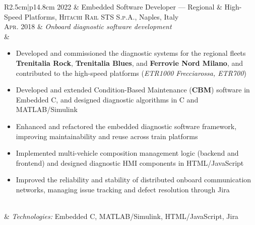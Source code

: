 \begin{longtable}{R{2.5cm}|p{14.8cm}}
	\textsc{2022}      & Embedded Software Developer --- Regional \& High-Speed Platforms, \textsc{Hitachi Rail STS S.p.A.}, Naples, Italy\\
	\textsc{Apr. 2018} & \emph{Onboard diagnostic software development}\\&
	\footnotesize{
		\begin{itemize}
			\item Developed and commissioned the diagnostic systems for the regional fleets \textbf{Trenitalia Rock}, \textbf{Trenitalia Blues}, and \textbf{Ferrovie Nord Milano}, and contributed to the high-speed platforms (\emph{ETR1000 Frecciarossa, ETR700})
			\item Developed and extended Condition-Based Maintenance (\textbf{CBM}) software in Embedded C, and designed diagnostic algorithms in C and MATLAB/Simulink
			\item Enhanced and refactored the embedded diagnostic software framework, improving maintainability and reuse across train platforms
			\item Implemented multi-vehicle composition management logic (backend and frontend) and designed diagnostic HMI components in HTML/JavaScript
			\item Improved the reliability and stability of distributed onboard communication networks, managing issue tracking and defect resolution through Jira
		\end{itemize}
		\vspace{-1em}
	}\\&
	\footnotesize{\emph{Technologies:} Embedded C, MATLAB/Simulink, HTML/JavaScript, Jira}\\

\end{longtable}
